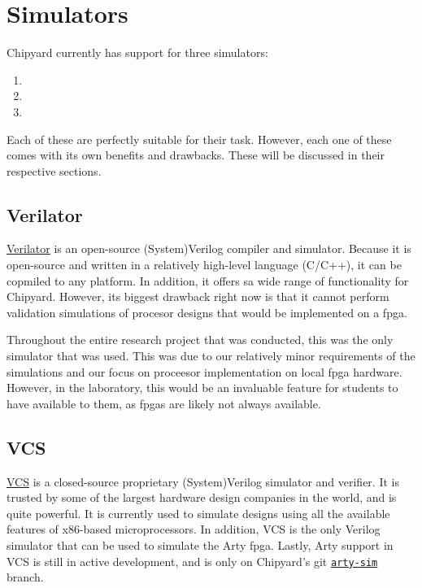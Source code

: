 \chapter{Simulators}\label{chap:Simulators}
Chipyard currently has support for three simulators:
\begin{enumerate}
\item {}
\item {}
\item {}
\end{enumerate}

Each of these are perfectly suitable for their task.
However, each one of these comes with its own benefits and drawbacks.
These will be discussed in their respective sections.

\section{Verilator}\label{sec:Verilator_Simulator}
\href{https://www.veripool.org/wiki/verilator}{Verilator} is an open-source (System)Verilog compiler and simulator.
Because it is open-source and written in a relatively high-level language (C/C++), it can be copmiled to any platform.
In addition, it offers sa wide range of functionality for Chipyard.
However, its biggest drawback right now is that it cannot perform validation simulations of procesor designs that would be implemented on a \gls{fpga}.

Throughout the entire research project that was conducted, this was the only simulator that was used.
This was due to our relatively minor requirements of the simulations and our focus on proceesor implementation on local \gls{fpga} hardware.
However, in the laboratory, this would be an invaluable feature for students to have available to them, as \glspl{fpga} are likely not always available.

\section{VCS}\label{sec:VCS_Simulator}
\href{https://www.synopsys.com/verification/simulation/vcs.html}{VCS} is a closed-source proprietary (System)Verilog simulator and verifier.
It is trusted by some of the largest hardware design companies in the world, and is quite powerful.
It is currently used to simulate designs using all the available features of x86-based microprocessors.
In addition, VCS is the only Verilog simulator that can be used to simulate the Arty \Gls{fpga}.
Lastly, Arty support in VCS is still in active development, and is only on Chipyard's git \href{https://github.com/ucb-bar/chipyard/tree/arty-sim}{\texttt{arty-sim}} branch.

